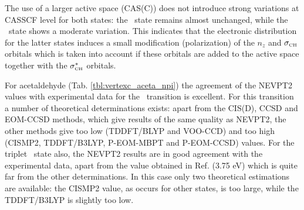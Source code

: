 

The use of a larger active space (CAS(C)) does not introduce strong variations at CASSCF 
level for both states: the \snpi\ state remains almost unchanged, while the
\tnpi\ state shows a moderate variation.  This indicates that the electronic
distribution for the latter states induces a small modification
(polarization) of the $n_z$ and $\sigma_{\mbox{\tiny CH}}$ orbitals which is taken
into account if these orbitals are added to the active space together with
the $\sigma_{\mbox{\tiny CH}}^*$ orbitals.


\vspace{3mm}
%

For acetaldehyde (Tab. \ref{tbl:vertexc_aceta_npi}) the agreement of the NEVPT2 values with experimental data for
the \snpi\ transition is excellent. For this transition a number of theoretical 
determinations exists: apart from the CIS(D)\cite{cpl-219-21-1994}, CCSD\cite{cpl-219-21-1994} and
EOM-CCSD\cite{cpl-241-26-1995} methods, which give results of the same quality as NEVPT2, the other
methods give too low (TDDFT/BLYP\cite{jcp-108-4060-1998} and VOO-CCD\cite{jcp-113-6509-2000}) and too high 
(CISMP2\cite{jpc-97-4293-1993}, TDDFT/B3LYP\cite{cpl-297-60-1998}, P-EOM-MBPT\cite{cpl-248-189-1996}
and P-EOM-CCSD\cite{cpl-248-189-1996}) values. For the triplet \npi\ state also, 
the NEVPT2 results are in good agreement with the experimental data, apart from the 
value obtained in Ref.  (3.75 eV) which is quite far from the
other determinations. In this case only two theoretical estimations are
available: the CISMP2\cite{jpc-97-4293-1993} value, as occurs for other
states, is too large, while the TDDFT/B3LYP\cite{cpl-297-60-1998} is
slightly too low. 

